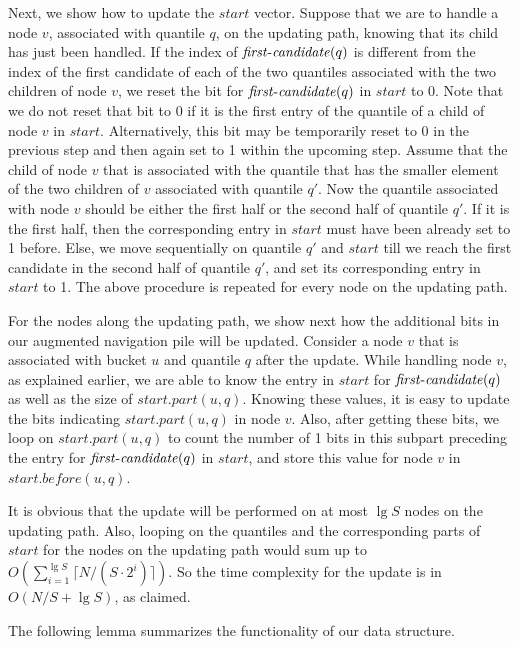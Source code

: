 \documentclass[final,onetabnum,onefignum,onethmnum]{siamltex}
\newcommand{\FirstCandidate}{\mbox{$\mathit{first}\mbox{\rm -}\mathit{candidate}$}}
\begin{document}
Next, we show how to update the $\mathit{start}$ vector.  Suppose that
we are to handle a node $v$, associated with quantile $q$, on the updating path, 
knowing that its child has just been handled.  If the index of 
$\FirstCandidate(q)$ is different from the index of the first 
candidate of each of the two quantiles associated with the two children
of node $v$, we reset the bit for $\FirstCandidate(q)$ 
in $\mathit{start}$ to 0.  Note that we do not reset that bit
to 0 if it is the first entry of the quantile of a child of node $v$
in $\mathit{start}$.  Alternatively, this bit may be temporarily reset
to 0 in the previous step and then again set to 1 within the upcoming
step.  Assume that the child of node $v$ that is associated with the quantile
that has the smaller element of the two children of $v$ associated with quantile
$q'$.  Now the quantile associated with node $v$ should be either the
first half or the second half of quantile $q'$.  If it is the first
half, then the corresponding entry in $\mathit{start}$ must have been
already set to 1 before.  Else, we move sequentially on quantile $q'$
and $\mathit{start}$ till we reach the first candidate in the second
half of quantile $q'$, and set its corresponding entry in $\mathit{start}$ to 1. 
The above procedure is repeated for every node on the updating path.

For the nodes along the updating path, we show next how the additional
bits in our augmented navigation pile will be updated.  Consider a
node $v$ that is associated with bucket $u$ and quantile $q$ after the update.
While handling node $v$, as explained earlier, we are able to know the
entry in $\mathit{start}$ for $\FirstCandidate(q)$ as
well as the size of $\mathit{start.part}(u,q)$.  Knowing these values,
it is easy to update the bits indicating $\mathit{start.part}(u,q)$ in
node $v$. Also, after getting these bits, we loop on
$\mathit{start.part}(u,q)$ to count the number of 1 bits in this subpart
preceding the entry for $\FirstCandidate(q)$ in
$\mathit{start}$, and store this value for node $v$ in $\mathit{start.before}(u,q)$.

It is obvious that the update will be performed on at most $\lg S$ nodes on
the updating path. Also, looping on the quantiles and the
corresponding parts of $\mathit{start}$ for the nodes on the updating
path would sum up to $O(\sum_{i=1}^{\lg S} \lceil N/(S \cdot 2^i)
\rceil )$. So the time complexity for the update is in $O(N/S + \lg
S)$, as claimed.

The following lemma summarizes the functionality of our data structure.
\end{document}
